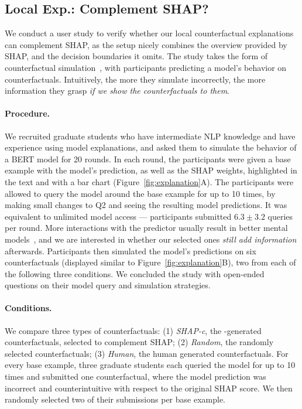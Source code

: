 \subsection{Local Exp.: Complement SHAP?}
\label{subsec:exp_user_study}

We conduct a user study to verify whether our local counterfactual explanations can complement SHAP, as the setup nicely combines the overview provided by SHAP, and the decision boundaries it omits.
The study takes the form of counterfactual simulation~\cite{hase2020evaluating}, with participants predicting a model's behavior on counterfactuals.
Intuitively, the more they simulate incorrectly, the more information they grasp \emph{if we show the counterfactuals to them}.

\paragraph{Procedure.}
We recruited  graduate students who have intermediate NLP knowledge and have experience using model explanations, and asked them to simulate the behavior of a \qqp BERT model for 20 rounds.
In each round, the participants were given a base example with the model's prediction, as well as the SHAP weights, highlighted in the text and with a bar chart (Figure~\ref{fig:explanation}A).
The participants were allowed to query the model around the base example for up to 10 times, by making small changes to Q2 and seeing the resulting model predictions.
It was equivalent to unlimited model access --- participants submitted $6.3\pm3.2$ queries per round.
More interactions with the predictor usually result in better mental models~\cite{miller}, and we are interested in whether our selected ones \emph{still add information} afterwards.
Participants then simulated the model's predictions on six counterfactuals (displayed similar to Figure~\ref{fig:explanation}B), two from each of the following three conditions.
We concluded the study with open-ended questions on their model query and simulation strategies.



\newcommand{\cshap}{\emph{SHAP-c}\xspace}
\newcommand{\crandom}{\emph{Random}\xspace}
\newcommand{\chuman}{\emph{Human}\xspace}
\paragraph{Conditions.} 
We compare three types of counterfactuals:
(1) \cshap, the \sysname-generated counterfactuals, selected to complement SHAP; 
(2) \crandom, the randomly selected \sysname counterfactuals; 
(3) \chuman, the human generated counterfactuals.
For every base example, three graduate students each queried the model for up to 10 times and submitted one counterfactual, where the model prediction was incorrect and counterintuitive with respect to the original SHAP score.
We then randomly selected two of their submissions per base example.




